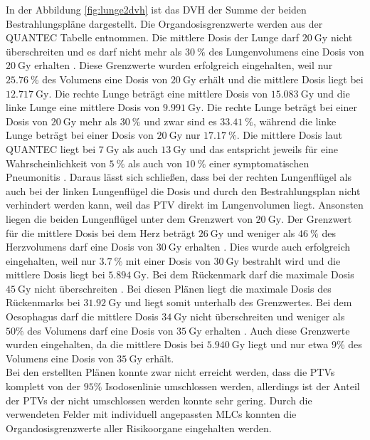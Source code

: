 In der Abbildung \ref{fig:lunge2dvh} ist das DVH der Summe der beiden Bestrahlungspläne dargestellt.
Die Organdosisgrenzwerte werden aus der QUANTEC Tabelle entnommen. Die mittlere Dosis der Lunge darf $\SI{20}{\gray}$ nicht überschreiten
und es darf nicht mehr als $\SI{30}{\percent}$ des Lungenvolumens eine Dosis von $\SI{20}{\gray}$ erhalten \cite{grenz}.
Diese Grenzwerte wurden erfolgreich eingehalten, weil nur $\SI{25.76}{\percent}$ des Volumens eine Dosis von $\SI{20}{\gray}$ erhält und die mittlere Dosis liegt bei $\SI{12.717}{\gray}$. Die rechte Lunge beträgt eine mittlere Dosis von $\SI{15.083}{\gray}$ und die linke Lunge eine mittlere Dosis von $\SI{9.991}{\gray}$. Die rechte Lunge beträgt bei einer Dosis von $\SI{20}{\gray}$ mehr als $\SI{30}{\percent}$ und zwar sind es $\SI{33.41}{\percent}$, während die linke Lunge beträgt bei einer Dosis von $\SI{20}{\gray}$ nur $\SI{17.17}{\percent}$.
Die mittlere Dosis laut QUANTEC liegt bei $\SI{7}{\gray}$ als auch $\SI{13}{\gray}$ und das entspricht jeweils für eine Wahrscheinlichkeit von $\SI{5}{\percent}$ als auch von $\SI{10}{\percent}$ einer symptomatischen Pneumonitis \cite{QUANTEC}. Daraus lässt sich schließen, dass bei der rechten Lungenflügel als auch bei der linken Lungenflügel die Dosis und durch den Bestrahlungsplan nicht verhindert werden kann, weil das PTV direkt im Lungenvolumen liegt. Ansonsten liegen die beiden Lungenflügel unter dem Grenzwert von $\SI{20}{\gray}$. 
Der Grenzwert für die mittlere Dosis bei dem Herz beträgt $\SI{26}{\gray}$ und weniger als $\SI{46}{\percent}$ des Herzvolumens darf
eine Dosis von $\SI{30}{\gray}$ erhalten \cite{grenz}. Dies wurde auch erfolgreich eingehalten, weil nur $\SI{3.7}{\percent}$ mit einer Dosis von
$\SI{30}{\gray}$ bestrahlt wird und die mittlere Dosis liegt bei $\SI{5.894}{\gray}$.
Bei dem Rückenmark darf die maximale Dosis $\SI{45}{\gray}$ nicht überschreiten \cite{grenz}.
Bei diesen Plänen liegt die maximale Dosis des Rückenmarks bei $\SI{31.92}{\gray}$ und liegt somit unterhalb des Grenzwertes.
Bei dem Oesophagus darf die mittlere Dosis $\SI{34}{\gray}$ nicht überschreiten und weniger als $50\%$ des Volumens darf eine Dosis von $\SI{35}{\gray}$
erhalten \cite{QUANTEC}. Auch diese Grenzwerte wurden eingehalten, da die mittlere Dosis bei $\SI{5.940}{\gray}$ liegt und nur etwa $9\%$ des Volumens eine
Dosis von $\SI{35}{\gray}$ erhält. \\

Bei den erstellten Plänen konnte zwar nicht erreicht werden, dass die PTVs komplett von der $95\%$ Isodosenlinie
umschlossen werden, allerdings ist der Anteil der PTVs der nicht umschlossen werden konnte sehr gering.
Durch die verwendeten Felder mit individuell angepassten MLCs konnten die Organdosisgrenzwerte aller Risikoorgane eingehalten werden.

